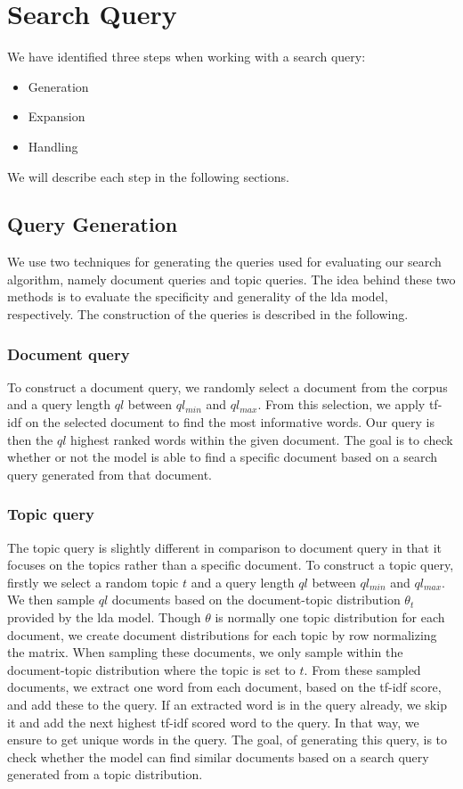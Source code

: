 \section{Search Query}
We have identified three steps when working with a search query:
\begin{itemize}
	\item Generation
	\item Expansion
	\item Handling
\end{itemize}
We will describe each step in the following sections.
\subsection{Query Generation}
We use two techniques for generating the queries used for evaluating our search algorithm, namely document queries and topic queries.
The idea behind these two methods is to evaluate the specificity and generality of the \gls{lda} model, respectively.
The construction of the queries is described in the following.

\subsubsection{Document query}
To construct a document query, we randomly select a document from the corpus and a query length $ql$ between $ql_{min}$ and $ql_{max}$.
From this selection, we apply \gls{tf-idf} on the selected document to find the most informative words.
Our query is then the $ql$ highest ranked words within the given document.
The goal is to check whether or not the model is able to find a specific document based on a search query generated from that document.

\subsubsection{Topic query} 
The topic query is slightly different in comparison to document query in that it focuses on the topics rather than a specific document.
To construct a topic query, firstly we select a random topic $t$ and a query length $ql$ between $ql_{min}$ and $ql_{max}$.
We then sample $ql$ documents based on the document-topic distribution $\theta_t$ provided by the \gls{lda} model.
Though $\theta$ is normally one topic distribution for each document, we create document distributions for each topic by row normalizing the matrix.
When sampling these documents, we only sample within the document-topic distribution where the topic is set to $t$.
From these sampled documents, we extract one word from each document, based on the \gls{tf-idf} score, and add these to the query.
If an extracted word is in the query already, we skip it and add the next highest \gls{tf-idf} scored word to the query.
In that way, we ensure to get unique words in the query.
The goal, of generating this query, is to check whether the model can find similar documents based on a search query generated from a topic distribution.

